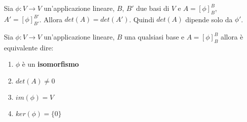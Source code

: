 \begin{proposition}
	Sia $\phi : V \to V$ un'applicazione lineare, $B$, $B'$ due basi di $V$ e $A=[\phi]^B_B$, $A' = [\phi]^{B'}_{B'}$. Allora $det(A) = det(A')$. Quindi $det(A)$ dipende solo da $\phi'$.
\end{proposition}

\begin{theorem}
	Sia $\phi: V \to V$ un'applicazione lineare, $B$ una qualsiasi base e $A = [\phi]^B_B$ allora è equivalente dire:
	\begin{enumerate}
		\item $\phi$ è un \textbf{isomorfismo}
		\item $det(A) \neq 0$
		\item $im(\phi) = V$
		\item $ker(\phi) = \{0\}$
	\end{enumerate}
\end{theorem}